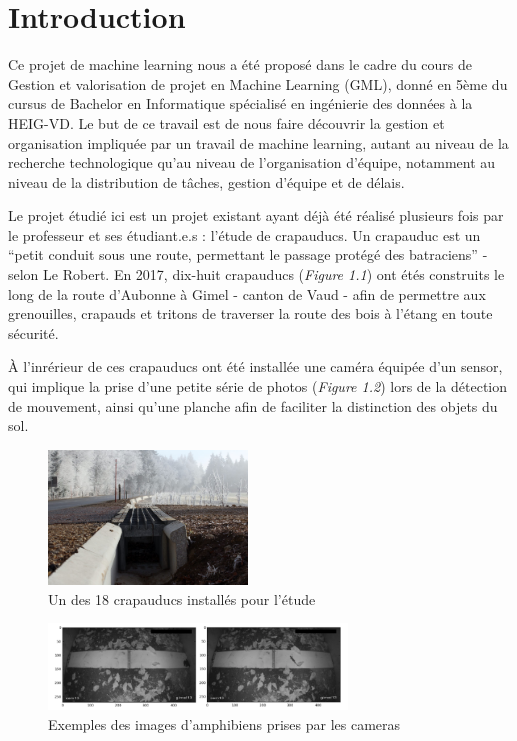 \chapter{Introduction}

Ce projet de machine learning nous a été proposé dans le cadre du cours de Gestion et valorisation de projet en Machine Learning (GML), donné en 5ème du cursus de Bachelor en Informatique spécialisé en ingénierie des données à la HEIG-VD. Le but de ce travail est de nous faire découvrir la gestion et organisation impliquée par un travail de machine learning, autant au niveau de la recherche technologique qu'au niveau de l'organisation d'équipe, notamment au niveau de la distribution de tâches, gestion d'équipe et de délais. \newline

Le projet étudié ici est un projet existant ayant déjà été réalisé plusieurs fois par le professeur et ses étudiant.e.s : l'étude de crapauducs. Un crapauduc est un “petit conduit sous une route, permettant le passage protégé des batraciens” - selon Le Robert. En 2017, dix-huit crapauducs (\textit{Figure 1.1}) ont étés construits le long de la route d'Aubonne à Gimel - canton de Vaud - afin de permettre aux grenouilles, crapauds et tritons de traverser la route des bois à l'étang en toute sécurité. \newline

À l'inrérieur de ces crapauducs ont été installée une caméra équipée d'un sensor, qui implique la prise d'une petite série de photos (\textit{Figure 1.2}) lors de la détection de mouvement, ainsi qu'une planche afin de faciliter la distinction des objets du sol. \newline

\begin{figure}[!htb]
    \centering
    \includegraphics[width=200px]{images/introduction_crapauduc_exterieur.png}
    \caption{Un des 18 crapauducs installés pour l'étude}
    \label{fig:Un des 18 crapauducs installés pour l'étude}
\end{figure}

\newpage

\begin{figure}[!htb]
    \centering
    \includegraphics[width=300px]{images/introduction_crapauduc_exemple_prise_camera.png}
    \caption{Exemples des images d'amphibiens prises par les cameras}
    \label{fig:Exemples des images d'amphibiens prises par les cameras}
\end{figure}

